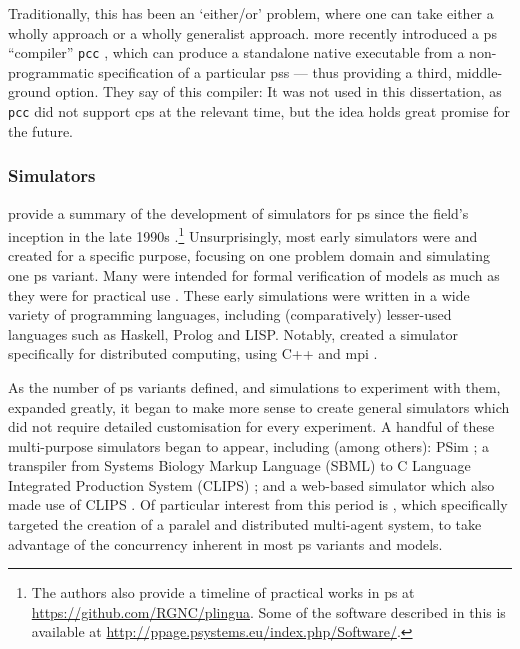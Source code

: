 Traditionally, this has been an `either/or' problem, where one can take either a wholly \adhoc{} approach or a wholly generalist approach.  \citeauthor{Perez-Hurtado2019} more recently introduced a \gls{ps} ``compiler'' \texttt{pcc} \cite{Perez-Hurtado2019}, which can produce a standalone native executable from a non-programmatic specification of a particular \glspl{ps} --- thus providing a third, middle-ground option.  They say of this compiler:   It was not used in this dissertation, as \texttt{pcc} did not support \gls{cps} at the relevant time, but the idea holds great promise for the future.


\subsubsection{\label{sec:back:simulators} Simulators}

\citeauthor{Valencia-Cabrera2019} provide a summary of the development of simulators for \Gls{ps} since the field's inception in the late 1990s \cite{Valencia-Cabrera2019}.\footnote{The authors also provide a timeline of practical works in \gls{ps} at \url{https://github.com/RGNC/plingua}.  Some of the software described in this  is available at \url{http://ppage.psystems.eu/index.php/Software/}.}  Unsurprisingly, most early simulators were \adhoc{} and created for a specific purpose, focusing on one problem domain and simulating one \gls{ps} variant.  Many were intended for formal verification of models as much as they were for practical use \cite{Gutierrez-Naranjo2007}.  These early simulations were written in a wide variety of programming languages, including (comparatively) lesser-used languages such as Haskell, Prolog and LISP.  Notably, \citeauthor{Ciobanu2004} created a simulator specifically for distributed computing, using C++ and \gls{mpi} \cite{Ciobanu2004}.

As the number of \gls{ps} variants defined, and simulations to experiment with them, expanded greatly, it began to make more sense to create general simulators which did not require detailed customisation for every experiment.  A handful of these multi-purpose simulators began to appear, including (among others): PSim \cite{Bianco2007,Bianco2007a}; a transpiler from Systems Biology Markup Language (SBML) to C Language Integrated Production System (CLIPS) \cite{NepomucenoChamorro2005};  and a web-based simulator which also made use of CLIPS \cite{Bonchis2005}.  Of particular interest from this period is \cite{Acampora2007}, which specifically targeted the creation of a paralel and distributed multi-agent system, to take advantage of the concurrency inherent in most \gls{ps} variants and models.

